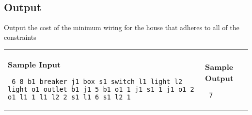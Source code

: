 \documentclass[11pt]{article}
\begin{document}
\subsection*{Output}

Output the cost of the minimum wiring for the house that adheres to all of the constraints

\vspace{0.25in}\hspace{-0.3in}\begin{tabular}{ll}

\parbox{3in}{{\large\bf Sample Input}

\vspace{0.15in}

{\tt 
6 8\linebreak
b1 breaker\linebreak
j1 box\linebreak
s1 switch\linebreak
l1 light\linebreak
l2 light\linebreak
o1 outlet\linebreak
b1 j1 5\linebreak
b1 o1 1\linebreak
j1 s1 1\linebreak
j1 o1 2\linebreak
o1 l1 1\linebreak
l1 l2 2\linebreak
s1 l1 6\linebreak
s1 l2 1\linebreak
}
}

&

\parbox{3in}{{\large\bf Sample Output}

\vspace{0.15in}

{\tt
7
}
}

\\
\end{tabular}
\end{document}
